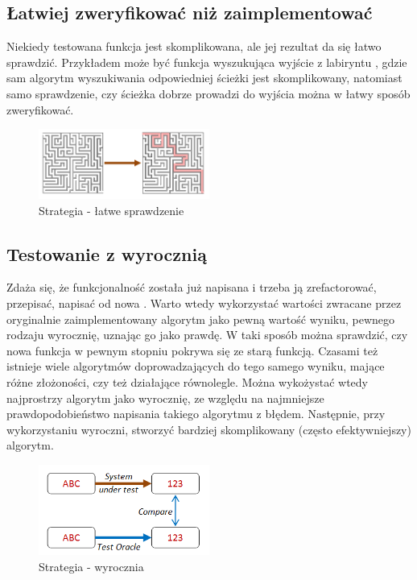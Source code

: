 \subsection{Łatwiej zweryfikować niż zaimplementować}
Niekiedy testowana funkcja jest skomplikowana, ale jej rezultat da się łatwo sprawdzić. Przykładem może być funkcja wyszukująca wyjście z labiryntu , gdzie sam algorytm wyszukiwania odpowiedniej ścieżki jest skomplikowany, 
natomiast samo sprawdzenie, czy ścieżka dobrze prowadzi do wyjścia można w łatwy sposób zweryfikować.

\begin{figure}
    \centering
    \includegraphics[width=0.5\textwidth]{images/property_easy_verification.png}
    \caption{Strategia - łatwe sprawdzenie}
    \label{fig:easy_verification_strategy}
\end{figure}

\subsection{Testowanie z wyrocznią}

Zdaża się, że funkcjonalność została już napisana i trzeba ją zrefactorować, przepisać, napisać od nowa . Warto wtedy wykorzystać wartości zwracane przez oryginalnie zaimplementowany algorytm jako pewną wartość wyniku, pewnego rodzaju wyrocznię, uznając go jako prawdę. 
W taki sposób można sprawdzić, czy nowa funkcja w pewnym stopniu pokrywa się ze starą funkcją. Czasami też istnieje wiele algorytmów doprowadzających do tego samego wyniku, mające różne złożoności, czy też działające równolegle. 
Można wykożystać wtedy najprostrzy algorytm jako wyrocznię, ze względu na najmniejsze prawdopodobieństwo napisania takiego algorytmu z błędem. Następnie, przy wykorzystaniu wyroczni, stworzyć bardziej skomplikowany (często efektywniejszy) algorytm.

\begin{figure}
    \centering
    \includegraphics[width=0.5\textwidth]{images/property_test_oracle.png}
    \caption{Strategia - wyrocznia}
    \label{fig:oracle_strategy}
\end{figure}


